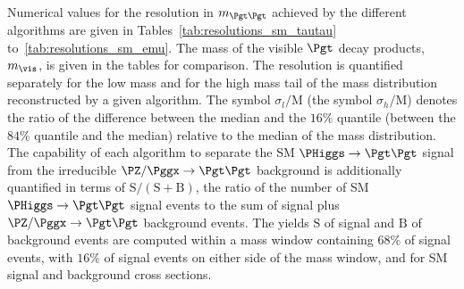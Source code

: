 Numerical values for the resolution in $m_{\Pgt\Pgt}$ achieved by the different algorithms are given in Tables~\ref{tab:resolutions_sm_tautau} to~\ref{tab:resolutions_sm_emu}.
The mass of the visible $\Pgt$ decay products, $m_{\vis}$, is given in the tables for comparison.
The resolution is quantified separately for the low mass and for the high mass tail of the mass distribution reconstructed by a given algorithm.
The symbol $\sigma_{l}/\textrm{M}$ (the symbol $\sigma_{h}/\textrm{M}$) denotes the 
ratio of the difference between the median and the $16\%$ quantile (between the $84\%$ quantile and the median) relative to the median
of the mass distribution.
The capability of each algorithm to separate the SM $\PHiggs \to \Pgt\Pgt$ signal from the irreducible $\PZ/\Pggx \to \Pgt\Pgt$ background 
is additionally quantified in terms of $\textrm{S}/(\textrm{S} + \textrm{B})$, the ratio of the number of SM $\PHiggs \to \Pgt\Pgt$ signal events to the sum of signal plus $\PZ/\Pggx \to \Pgt\Pgt$ background events.
The yields $\textrm{S}$ of signal and $\textrm{B}$ of background events are computed within a mass window containing $68\%$ of signal events,
with $16\%$ of signal events on either side of the mass window, and for SM signal and background cross sections.


